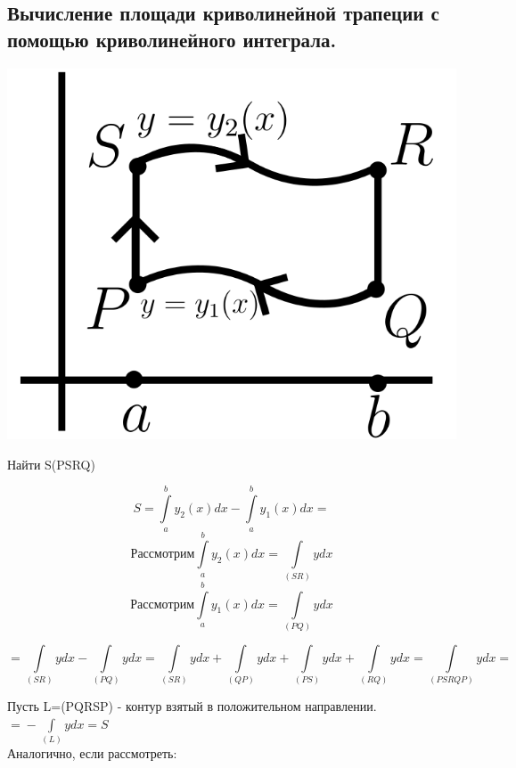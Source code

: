 \documentclass[12pt]{article}
\let\ORIincludegraphics\includegraphics
\renewcommand{\includegraphics}[2][]{\ORIincludegraphics[scale=0.65,#1]{#2}}
\let\oldint\int
\renewcommand{\int}{\oldint\limits}
\begin{document}
  \subsection{Вычисление площади криволинейной трапеции с помощью криволинейного интеграла.}
  \begin{minipage}{0.45\textwidth}
    \includegraphics[scale=0.6]{8.5.1.png}
  \end{minipage}
  \hspace{1em}
  \begin{minipage}{0.55\textwidth}
    \begin{center}
      Найти S(PSRQ)
    \end{center}
    \[S=\int_{a}^{b}y_2(x)dx-\int_{a}^{b}y_1(x)dx \boxed{=}\]
     \[\text{Рассмотрим} \int_{a}^{b}y_2(x)dx=\int_{(SR)}ydx\]
      \[\text{Рассмотрим}\int_{a}^{b}y_1(x)dx=\int_{(PQ)}ydx\]
  \end{minipage}
  \vspace{1em}
  \[\boxed{=} \int_{(SR)}ydx-\int_{(PQ)}ydx=\int_{(SR)}ydx+\int_{(QP)}ydx+\int_{(PS)}ydx+\int_{(RQ)}ydx=\int_{(PSRQP)}ydx \boxed{=}\]
  \par
  Пусть L=(PQRSP) - контур взятый в положительном направлении. $\boxed{=}-\int_{(L)}ydx=S$\\
  Аналогично, если рассмотреть:
\end{document}

